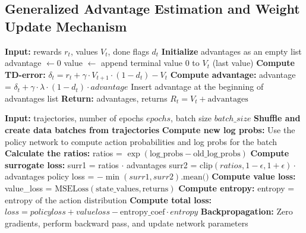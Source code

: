 \subsection{Generalized Advantage Estimation and Weight Update Mechanism}
\begin{algorithmic}
    \State \textbf{Input:} rewards $r_t$, values $V_t$, done flags $d_t$
    \State \textbf{Initialize} advantages as an empty list
    \State advantage $\gets 0$
    \State value $\gets$ append terminal value $0$ to $V_t$ (last value)
        \State \textbf{Compute TD-error:}
        \State \hspace{1em} $\delta_t = r_t + \gamma \cdot V_{t+1} \cdot (1 - d_t) - V_t$
        \State \textbf{Compute advantage:}
        \State \hspace{1em} advantage = $\delta_t + \gamma \cdot \lambda \cdot (1 - d_t) \cdot advantage$
        \State \hspace{1em} Insert advantage at the beginning of advantages list
    \EndFor
    \State \textbf{Return:} advantages, returns $R_t = V_t + \text{advantages}$
\end{algorithmic}

\begin{algorithmic}
    \State \textbf{Input:} trajectories, number of epochs $epochs$, batch size $batch\_size$
        \State \textbf{Shuffle and create data batches from trajectories}
            \State \textbf{Compute new log probs:}
            \State \hspace{1em} Use the policy network to compute action probabilities and log probs for the batch
            \State \textbf{Calculate the ratios:}
            \State \hspace{1em} ratios = $\exp(\text{log\_probs} - \text{old\_log\_probs})$
            \State \textbf{Compute surrogate loss:}
            \State \hspace{1em} surr1 = ratios $\cdot$ advantages
            \State \hspace{1em} surr2 = $\text{clip}(ratios, 1 - \epsilon, 1 + \epsilon) \cdot$ advantages
            \State \hspace{1em} policy loss = $-\min(surr1, surr2) \text{.mean()}$
            \State \textbf{Compute value loss:}
            \State \hspace{1em} value\_loss = $\text{MSELoss}(\text{state\_values}, \text{returns})$
            \State \textbf{Compute entropy:}
            \State \hspace{1em} entropy = $\text{entropy of the action distribution}$
            \State \textbf{Compute total loss:}
            \State \hspace{1em} $loss = policy loss + value loss - \text{entropy\_coef} \cdot entropy$
            \State \textbf{Backpropagation:}
            \State \hspace{1em} Zero gradients, perform backward pass, and update network parameters
        \EndFor
    \EndFor
\end{algorithmic}
